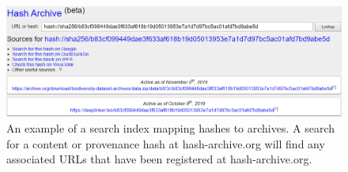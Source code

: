 \begin{figure}[t] %


\includegraphics[width=\textwidth]{figures/fig5.png}

\caption{An example of a search index mapping hashes to archives. A search for a content or provenance hash at hash-archive.org will find any associated URLs that have been registered at hash-archive.org.}

\label{fig5} %

\end{figure}
